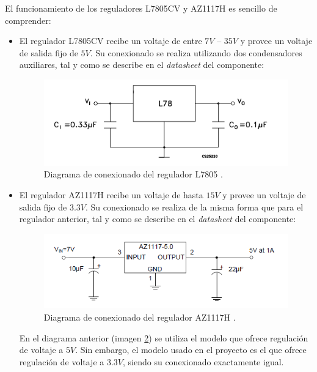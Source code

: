 El funcionamiento de los reguladores L7805CV y AZ1117H es sencillo de comprender:
\begin{itemize}
    \item El regulador L7805CV recibe un voltaje de entre $7V$ -- $35V$ y provee un voltaje de salida fijo de $5V$. Su conexionado se realiza utilizando dos condensadores auxiliares, tal y como se describe en el \textit{datasheet} del componente:
    
    \begin{figure}[H]
    \centering 
    \includegraphics[width=.75\linewidth]{pictures/L7805Datasheet.PNG}
    \caption{Diagrama de conexionado del regulador L7805 \cite{stReguladorL7805CVDatasheet}.}
    \label{fig:L7805_Conexionado}
    \end{figure}
    
    \item El regulador AZ1117H recibe un voltaje de hasta $15V$ y provee un voltaje de salida fijo de $3.3V$. Su conexionado se realiza de la misma forma que para el regulador anterior, tal y como se describe en el \textit{datasheet} del componente:
    
    \begin{figure}[H]
    \centering 
    \includegraphics[width=.75\linewidth]{pictures/AZ1117Hdatasheet.PNG}
    \caption{Diagrama de conexionado del regulador AZ1117H \cite{diodesinc.ReguladorAZ1117HDatasheet}.}
    \label{fig:AZ1117H_Conexionado}
    \end{figure}
    
    En el diagrama anterior (imagen \ref{fig:AZ1117H_Conexionado}) se utiliza el modelo que ofrece regulación de voltaje a $5V$. Sin embargo, el modelo usado en el proyecto es el que ofrece regulación de voltaje a $3.3V$, siendo su conexionado exactamente igual.
    
\end{itemize}

